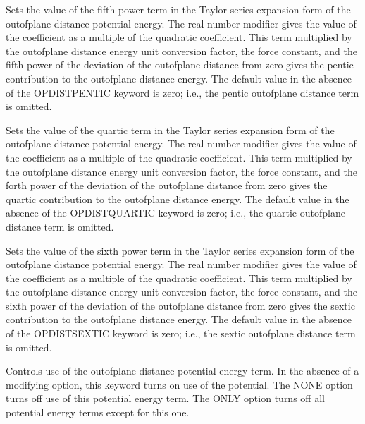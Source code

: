 \documentclass[letterpaper,11pt,english]{sphinxmanual}
\begin{document}
  Sets the value of the fifth power term in the Taylor series expansion form of the out\sphinxhyphen{}of\sphinxhyphen{}plane distance potential energy. The real number modifier gives the value of the coefficient as a multiple of the quadratic coefficient. This term multiplied by the out\sphinxhyphen{}of\sphinxhyphen{}plane distance energy unit conversion factor, the force constant, and the fifth power of the deviation of the out\sphinxhyphen{}of\sphinxhyphen{}plane distance from zero gives the pentic contribution to the out\sphinxhyphen{}of\sphinxhyphen{}plane distance energy. The default value in the absence of the OPDIST\sphinxhyphen{}PENTIC keyword is zero; i.e., the pentic out\sphinxhyphen{}of\sphinxhyphen{}plane distance term is omitted.

  Sets the value of the quartic term in the Taylor series expansion form of the out\sphinxhyphen{}of\sphinxhyphen{}plane distance potential energy. The real number modifier gives the value of the coefficient as a multiple of the quadratic coefficient. This term multiplied by the out\sphinxhyphen{}of\sphinxhyphen{}plane distance energy unit conversion factor, the force constant, and the forth power of the deviation of the out\sphinxhyphen{}of\sphinxhyphen{}plane distance from zero gives the quartic contribution to the out\sphinxhyphen{}of\sphinxhyphen{}plane distance energy. The default value in the absence of the OPDIST\sphinxhyphen{}QUARTIC keyword is zero; i.e., the quartic out\sphinxhyphen{}of\sphinxhyphen{}plane distance term is omitted.

  Sets the value of the sixth power term in the Taylor series expansion form of the out\sphinxhyphen{}of\sphinxhyphen{}plane distance potential energy. The real number modifier gives the value of the coefficient as a multiple of the quadratic coefficient. This term multiplied by the out\sphinxhyphen{}of\sphinxhyphen{}plane distance energy unit conversion factor, the force constant, and the sixth power of the deviation of the out\sphinxhyphen{}of\sphinxhyphen{}plane distance from zero gives the sextic contribution to the out\sphinxhyphen{}of\sphinxhyphen{}plane distance energy. The default value in the absence of the OPDIST\sphinxhyphen{}SEXTIC keyword is zero; i.e., the sextic out\sphinxhyphen{}of\sphinxhyphen{}plane distance term is omitted.

  Controls use of the out\sphinxhyphen{}of\sphinxhyphen{}plane distance potential energy term. In the absence of a modifying option, this keyword turns on use of the potential. The NONE option turns off use of this potential energy term. The ONLY option turns off all potential energy terms except for this one.
\end{document}
